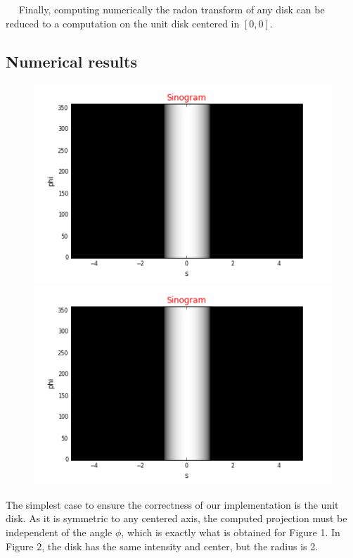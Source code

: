 \documentclass[a4,12pt]{article}
\begin{document}
~~ Finally, computing numerically the radon transform of any disk can be reduced to a computation on the unit disk centered in $[0,0]$. 
\subsection{Numerical results}
\begin{figure}[h!]
   \begin{minipage}[c]{.46\linewidth}
      \includegraphics[scale=0.5]{../images/sinograms/unitDisk.png} 
   \end{minipage} \hfill
   \begin{minipage}[c]{.46\linewidth}
      \includegraphics[scale=0.5]{../images/sinograms/centeredDisk2.png} 
   \end{minipage}
\end{figure}

The simplest case to ensure the correctness of our implementation is the unit disk. As it is symmetric to any centered axis, the computed projection must be independent of the angle $\phi$, which is exactly what is obtained for Figure 1. In Figure 2, the disk has the same intensity and center, but the radius is 2.  \\
\end{document}
